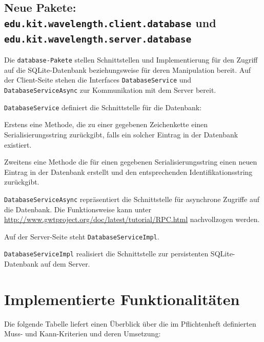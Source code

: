 \documentclass[parskip=full,11pt]{scrartcl}
\begin{document}
\subsection[Hinzugefügte Pakete]{Neue Pakete: \texttt{edu.kit.wavelength.client.database} und \texttt{edu.kit.wavelength.server.database}}

Die \texttt{database-Pakete} stellen Schnittstellen und Implementierung für den Zugriff auf die SQLite-Datenbank beziehungsweise für deren Manipulation bereit.
Auf der Client-Seite stehen die Interfaces \texttt{DatabaseService} und \texttt{DatabaseServiceAsync} zur Kommunikation mit dem Server bereit.

\texttt{DatabaseService} definiert die Schnittstelle für die Datenbank:

Erstens eine Methode, die zu einer gegebenen Zeichenkette einen Serialisierungsstring zurückgibt,
falls ein solcher Eintrag in der Datenbank existiert.

Zweitens eine Methode die für einen gegebenen Serialisierungsstring einen neuen Eintrag in der Datenbank erstellt und den entsprechenden Identifikationsstring zurückgibt.

\texttt{DatabaseServiceAsync} repräsentiert die Schnittstelle für asynchrone Zugriffe auf die Datenbank.
Die Funktionsweise kann unter \href{http://www.gwtproject.org/doc/latest/tutorial/RPC.html}{http://www.gwtproject.org/doc/latest/tutorial/RPC.html} nachvollzogen werden.

Auf der Server-Seite steht \texttt{DatabaseServiceImpl}.

\texttt{DatabaseServiceImpl} realisiert die Schnittstelle zur persistenten SQLite-Datenbank auf dem Server.

\newpage
\section{Implementierte Funktionalitäten}
Die folgende Tabelle liefert einen Überblick über die im Pflichtenheft definierten Muss- und Kann-Kriterien und deren Umsetzung:
\end{document}
